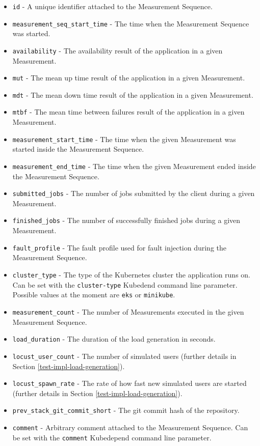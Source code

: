 \begin{itemize}
	\item \texttt{id} - A unique identifier attached to the Measurement Sequence.
	\item \texttt{measurement\_seq\_start\_time} - The time when the Measurement Sequence was started.
	\item \texttt{availability} - The availability result of the application in a given Measurement.
	\item \texttt{mut} - The mean up time result of the application in a given Measurement.
	\item \texttt{mdt} - The mean down time result of the application in a given Measurement.
	\item \texttt{mtbf} - The mean time between failures result of the application in a given Measurement.
	\item \texttt{measurement\_start\_time} - The time when the given Measurement was started inside the Measurement Sequence.
	\item \texttt{measurement\_end\_time} - The time when the given Measurement ended inside the Measurement Sequence.
	\item \texttt{submitted\_jobs} - The number of jobs submitted by the client during a given Measurement.
	\item \texttt{finished\_jobs} - The number of successfully finished jobs during a given Measurement.
	\item \texttt{fault\_profile} - The fault profile used for fault injection during the Measurement Sequence.
	\item \texttt{cluster\_type} - The type of the Kubernetes cluster the application runs on. Can be set with the \texttt{cluster-type} Kubedend command line parameter. Possible values at the moment are \texttt{eks} or \texttt{minikube}.
	\item \texttt{measurement\_count} - The number of Measurements executed in the given Measurement Sequence.
	\item \texttt{load\_duration} - The duration of the load generation in seconds.
	\item \texttt{locust\_user\_count} - The number of simulated users (further details in Section \ref{test-impl-load-generation}).
	\item \texttt{locust\_spawn\_rate} - The rate of how fast new simulated users are started (further details in Section \ref{test-impl-load-generation}).
	\item \texttt{prev\_stack\_git\_commit\_short} - The git commit hash of the repository.
	\item \texttt{comment} - Arbitrary comment attached to the Measurement Sequence. Can be set with the \texttt{comment} Kubedepend command line parameter.
	
\end{itemize}

